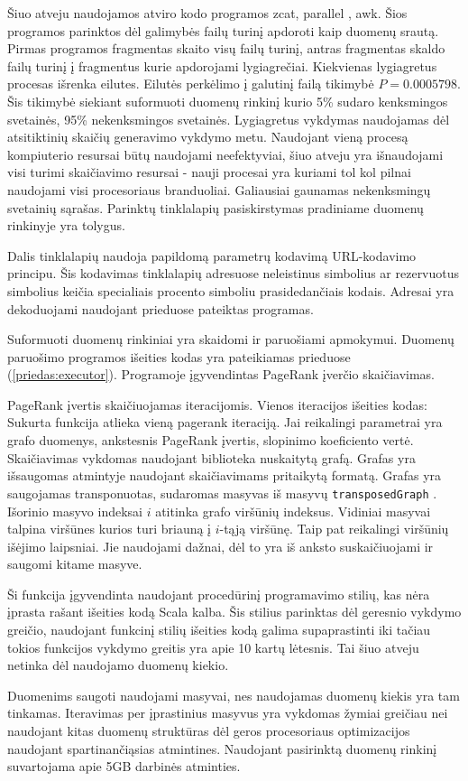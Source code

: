 Šiuo atveju naudojamos atviro kodo programos zcat, parallel \cite{parallel}, awk. Šios programos parinktos
dėl galimybės failų turinį apdoroti kaip duomenų srautą.   Pirmas programos fragmentas skaito visų failų turinį,
antras fragmentas skaldo failų turinį į fragmentus kurie apdorojami lygiagrečiai. Kiekvienas lygiagretus procesas
išrenka eilutes. Eilutės perkėlimo į galutinį failą tikimybė $P = 0.0005798$. Šis tikimybė siekiant suformuoti
duomenų rinkinį kurio 5\% sudaro kenksmingos svetainės, 95\% nekenksmingos svetainės. Lygiagretus vykdymas
naudojamas dėl atsitiktinių skaičių generavimo vykdymo metu. Naudojant vieną procesą kompiuterio resursai būtų
naudojami neefektyviai, šiuo atveju yra išnaudojami visi turimi skaičiavimo resursai - nauji procesai yra
kuriami tol kol pilnai naudojami visi procesoriaus branduoliai. Galiausiai gaunamas nekenksmingų svetainių
sąrašas. Parinktų tinklalapių pasiskirstymas pradiniame duomenų rinkinyje yra tolygus.

Dalis tinklalapių naudoja papildomą parametrų kodavimą URL-kodavimo principu. Šis kodavimas tinklalapių adresuose
neleistinus simbolius ar rezervuotus simbolius keičia specialiais procento simboliu prasidedančiais kodais.
Adresai yra dekoduojami naudojant prieduose pateiktas programas.


Suformuoti duomenų rinkiniai yra skaidomi ir paruošiami apmokymui. Duomenų paruošimo programos išeities
kodas yra pateikiamas prieduose (\ref{priedas:executor}). Programoje įgyvendintas PageRank įverčio skaičiavimas.

PageRank įvertis skaičiuojamas iteracijomis. Vienos iteracijos išeities kodas:
Sukurta funkcija atlieka vieną pagerank iteraciją. Jai reikalingi  parametrai yra grafo duomenys, ankstesnis
PageRank įvertis, slopinimo koeficiento vertė. Skaičiavimas vykdomas naudojant biblioteka \cite{webgraph} nuskaitytą
grafą. Grafas yra išsaugomas atmintyje naudojant skaičiavimams pritaikytą formatą. Grafas yra saugojamas
transponuotas, sudaromas masyvas iš masyvų \texttt{transposedGraph} . Išorinio masyvo indeksai $i$ atitinka
grafo viršūnių indeksus. Vidiniai masyvai talpina viršūnes kurios turi briauną į $i$-tąją viršūnę. Taip pat
reikalingi viršūnių išėjimo laipsniai. Jie naudojami dažnai, dėl to yra iš anksto suskaičiuojami ir saugomi kitame masyve.

Ši funkcija įgyvendinta naudojant procedūrinį programavimo stilių, kas nėra įprasta rašant išeities kodą Scala
kalba. Šis stilius parinktas dėl geresnio vykdymo greičio, naudojant funkcinį stilių išeities kodą galima
supaprastinti iki
tačiau tokios funkcijos vykdymo greitis yra apie 10 kartų lėtesnis. Tai šiuo atveju netinka dėl naudojamo duomenų kiekio.

Duomenims saugoti naudojami masyvai, nes naudojamas duomenų kiekis yra tam tinkamas. Iteravimas per
įprastinius masyvus yra vykdomas žymiai greičiau nei naudojant kitas duomenų struktūras dėl geros
procesoriaus optimizacijos naudojant spartinančiąsias atmintines. Naudojant pasirinktą duomenų
rinkinį suvartojama apie 5GB darbinės atminties.